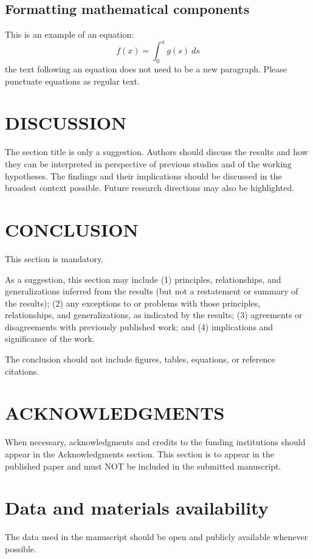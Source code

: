 \documentclass{BrJG_submit}
\begin{document}
\subsection*{Formatting mathematical components}
This is an example of an equation:
\begin{equation}
	f(x) = \int_0^x g(s) \ ds
\end{equation}
the text following an equation does not need to be a new paragraph. Please punctuate equations as regular text.

\section*{DISCUSSION}
The section title is only a suggestion. Authors should discuss the results and how they can be interpreted in perspective of previous studies and of the working hypotheses. The findings and their implications should be discussed in the broadest context possible. Future research directions may also be highlighted.

\section*{CONCLUSION}
This section is mandatory.

As a suggestion, this section may include (1) principles, relationships, and generalizations inferred from the results (but not a restatement or summary of the results); (2) any exceptions to or problems with those principles, relationships, and generalizations, as indicated by the results; (3) agreements or disagreements with previously published work; and (4) implications and significance of the work.

The conclusion should not include figures, tables, equations, or reference citations.


\section*{ACKNOWLEDGMENTS}
When necessary, acknowledgments and credits to the funding institutions should appear in the Acknowledgments section. This section is to appear in the published paper and must NOT be included in the submitted manuscript.

\section*{Data and materials availability}
The data used in the manuscript should be open and publicly available whenever possible.
\end{document}
